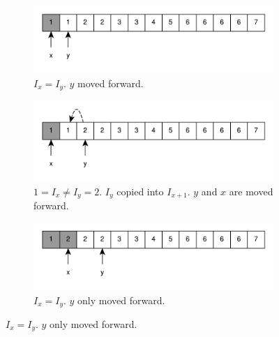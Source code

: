 \begin{figure}
	\centering
	\vspace*{-0.0in}
	\begin{subfigure}[t]{0.45\textwidth}
		\includegraphics[width=1\linewidth]{sources/remove_duplicated_sorted_array_inplace/images/example1_1}
		\vspace*{-10mm}
		\caption{$I_x = I_y$. $y$ moved forward.}
		\label{fig:remove_duplicated_sorted_array_inplace:example1_1}
	 \end{subfigure}
	 \hfill
	 \begin{subfigure}[t]{0.45\textwidth}
		\includegraphics[width=1\linewidth]{sources/remove_duplicated_sorted_array_inplace/images/example1_2}
		\vspace*{-10mm}
		\caption{$1 = I_x \neq I_y = 2$. $I_y$ copied into $I_{x+1}$. $y$ and $x$ are moved forward.}
		\label{fig:remove_duplicated_sorted_array_inplace:example1_2}
	 \end{subfigure}
	 \hfill
	 \begin{subfigure}[t]{0.45\textwidth}
		\includegraphics[width=1\linewidth]{sources/remove_duplicated_sorted_array_inplace/images/example1_3}
		\caption{$I_x = I_y$. $y$ only moved forward.}
		\label{fig:remove_duplicated_sorted_array_inplace:example1_3}
	 \end{subfigure}

\end{figure}
